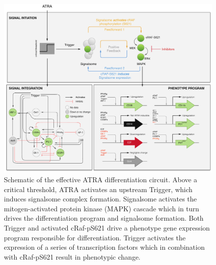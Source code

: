 \documentclass[12pt]{article}
\begin{document}
\clearpage

\begin{figure}[!t]
\includegraphics[width=1.0\textwidth]{./figs/Fig-1-Network_v3.pdf}
\caption{Schematic of the effective ATRA differentiation circuit.
Above a critical threshold, ATRA activates an upstream Trigger, which induces signalsome complex formation.
Signalsome activates the mitogen-activated protein kinase (MAPK) cascade which in turn
drives the differentiation program and signalsome formation.
Both Trigger and activated cRaf-pS621 drive a phenotype gene expression program responsible for differentiation.
Trigger activates the expression of a series of transcription factors which in combination with cRaf-pS621 result in phenotypic change.}\label{fig:network}
\end{figure}
\end{document}
